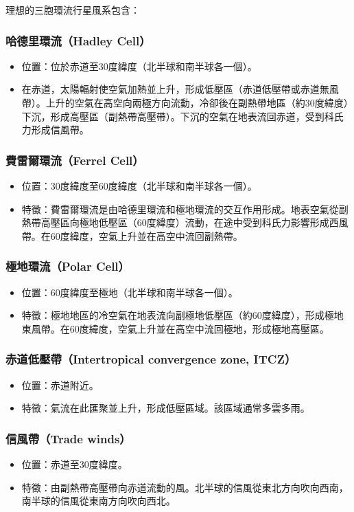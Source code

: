\documentclass[a4paper,12pt]{report}
\begin{document}
\begin{itemize}
理想的三胞環流行星風系包含：
\subsubsection{哈德里環流（Hadley Cell）}
\begin{itemize}
  \item 位置：位於赤道至30度緯度（北半球和南半球各一個）。
  \item 在赤道，太陽輻射使空氣加熱並上升，形成低壓區（赤道低壓帶或赤道無風帶）。上升的空氣在高空向兩極方向流動，冷卻後在副熱帶地區（約30度緯度）下沉，形成高壓區（副熱帶高壓帶）。下沉的空氣在地表流回赤道，受到科氏力形成信風帶。
\end{itemize}
\subsubsection{費雷爾環流（Ferrel Cell）}
\begin{itemize}
  \item 位置：30度緯度至60度緯度（北半球和南半球各一個）。
  \item 特徵：費雷爾環流是由哈德里環流和極地環流的交互作用形成。地表空氣從副熱帶高壓區向極地低壓區（60度緯度）流動，在途中受到科氏力影響形成西風帶。在60度緯度，空氣上升並在高空中流回副熱帶。
\end{itemize}
\subsubsection{極地環流（Polar Cell）}
\begin{itemize}
  \item 位置：60度緯度至極地（北半球和南半球各一個）。
  \item 特徵：極地地區的冷空氣在地表流向副極地低壓區（約60度緯度），形成極地東風帶。在60度緯度，空氣上升並在高空中流回極地，形成極地高壓區。
\end{itemize}
\subsubsection{赤道低壓帶（Intertropical convergence zone, ITCZ）}
\begin{itemize}
  \item 位置：赤道附近。
  \item 特徵：氣流在此匯聚並上升，形成低壓區域。該區域通常多雲多雨。
\end{itemize}
\subsubsection{信風帶（Trade winds）}
\begin{itemize}
  \item 位置：赤道至30度緯度。
  \item 特徵：由副熱帶高壓帶向赤道流動的風。北半球的信風從東北方向吹向西南，南半球的信風從東南方向吹向西北。
\end{itemize}

\end{itemize}
\end{document}
